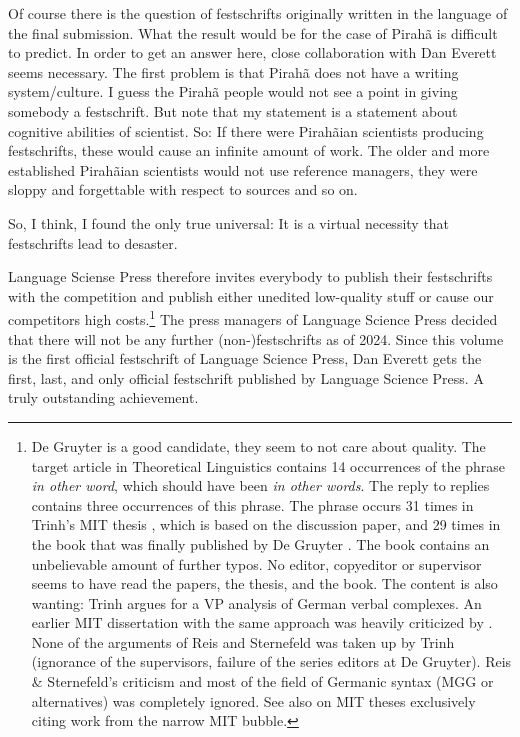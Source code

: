 \documentclass[output=paper,colorlinks,citecolor=brown]{langscibook}
\begin{document}
Of course there is the question of festschrifts originally written in the language of the final
submission. What the result would be for the case of Pirahã is difficult to predict. In order to get
an answer here, close collaboration with Dan Everett seems necessary. The first problem is that
Pirahã does not have a writing system/culture. I guess the Pirahã people would not see a point in giving
somebody a festschrift. But note that my statement is a statement about cognitive abilities of
scientist. So: If there were Pirahãian scientists producing festschrifts, these would cause an
infinite amount of work. The older and more established Pirahãian scientists would not use reference
managers, they were sloppy and forgettable with respect to sources and so on.

So, I think, I found the only true universal: It is a virtual necessity that fest\-schrifts lead to
desaster.

Language Sciense Press therefore invites everybody to publish their festschrifts with the
competition and publish either unedited low-quality stuff or cause our competitors high
costs.\footnote{
  De Gruyter is a good candidate, they seem to not care about quality. The target article
  \citet{Trinh2009a-u} in Theoretical Linguistics contains 14 occurrences of the phrase \emph{in
    other word}, which should have been \emph{in other words}. The reply to replies
  \citep{Trinh2010a-u} contains three occurrences of this phrase. The phrase occurs 31 times in
  Trinh's MIT thesis \citeyearpar{Trinh2011a}, which is based on the discussion paper, and 29 times in the book that was finally published by De Gruyter
  \citep{Trinh2019a}. The book contains an unbelievable amount of further typos. No editor, copyeditor or
  supervisor seems to have read the papers, the thesis, and the book. The content is also wanting:
  Trinh argues for a VP analysis of German verbal complexes. An earlier MIT dissertation with the
  same approach was heavily criticized by \citet{ReisSternefeld2004}. None of the arguments of Reis
  and Sternefeld was taken up by Trinh (ignorance of the supervisors, failure of the series editors
  at De Gruyter). Reis \& Sternefeld's criticism and most of the field of Germanic syntax
  (MGG or alternatives) was completely ignored. See also \citet[]{ReisSternefeld2004} on
  MIT theses exclusively citing work from the narrow MIT bubble.
}
The press managers of Language Science Press decided that there will not be any further
(non-)festschrifts as of 2024. Since this volume is the first official festschrift of Language
Science Press, Dan Everett gets the first, last, and only official festschrift published by Language
Science Press. A truly outstanding achievement. 
\end{document}

